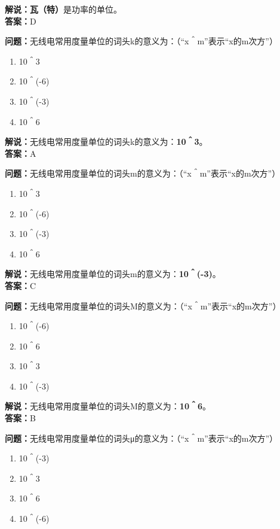\textbf{解说：瓦（特）}是功率的单位。\\\textbf{答案：}D



\textbf{问题：}无线电常用度量单位的词头k的意义为：（“x＾m”表示“x的m次方”）

\begin{enumerate}[label=\Alph*), leftmargin=1cm]
	\item 10＾3
	\item 10＾(-6)
	\item 10＾(-3)
	\item 10＾6
\end{enumerate}

\textbf{解说：}无线电常用度量单位的词头k的意义为：\textbf{10＾3}。\\\textbf{答案：}A



\textbf{问题：}无线电常用度量单位的词头m的意义为：（“x＾m”表示“x的m次方”）

\begin{enumerate}[label=\Alph*), leftmargin=1cm]
	\item 10＾3
	\item 10＾(-6)
	\item 10＾(-3)
	\item 10＾6
\end{enumerate}

\textbf{解说：}无线电常用度量单位的词头m的意义为：\textbf{10＾(-3)}。\\\textbf{答案：}C



\textbf{问题：}无线电常用度量单位的词头M的意义为：（“x＾m”表示“x的m次方”）

\begin{enumerate}[label=\Alph*), leftmargin=1cm]
	\item 10＾(-6)
	\item 10＾6
	\item 10＾3
	\item 10＾(-3)
\end{enumerate}

\textbf{解说：}无线电常用度量单位的词头M的意义为：\textbf{10＾6}。\\\textbf{答案：}B



\textbf{问题：}无线电常用度量单位的词头μ的意义为：（“x＾m”表示“x的m次方”）

\begin{enumerate}[label=\Alph*), leftmargin=1cm]
	\item 10＾(-3)
	\item 10＾3
	\item 10＾6
	\item 10＾(-6)
\end{enumerate}

